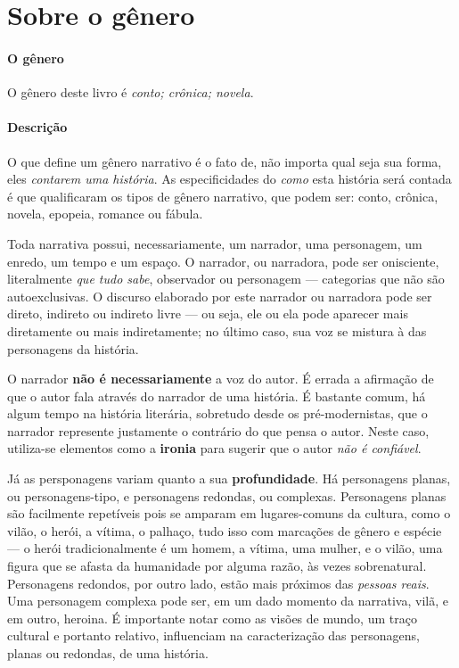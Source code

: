 \documentclass[11pt]{extarticle}
\begin{document}
\section{Sobre o gênero}

\paragraph{O gênero} O gênero deste livro é \textit{conto; crônica; novela}. 

\paragraph{Descrição} O que define um gênero narrativo é o fato de, não importa
qual seja sua forma, eles \textit{contarem uma história}.
As especificidades do \textit{como} esta história será contada é que
qualificaram os tipos de gênero narrativo, que podem ser: conto, crônica, novela,
epopeia, romance ou fábula. 

Toda narrativa possui, necessariamente, um narrador, uma personagem, um enredo,
um tempo e um espaço. O narrador, ou narradora, pode ser onisciente, literalmente
\textit{que tudo sabe}, observador ou personagem --- categorias que não são autoexclusivas.
O discurso elaborado por este narrador ou narradora pode ser direto, indireto ou indireto livre 
--- ou seja, ele ou ela pode aparecer mais diretamente ou mais indiretamente; no último caso,
sua voz se mistura à das personagens da história.

O narrador \textbf{não é necessariamente} a voz do autor. É errada a afirmação
de que o autor fala através do narrador de uma história. É bastante comum,
há algum tempo na história literária, sobretudo desde os pré-modernistas, que 
o narrador represente justamente o contrário do que pensa o autor. Neste caso, 
utiliza-se elementos como a \textbf{ironia} para sugerir que o autor \textit{não é confiável}.

Já as persponagens variam quanto a sua \textbf{profundidade}. Há personagens planas, ou
personagens-tipo, e personagens redondas, ou complexas. Personagens planas
são facilmente repetíveis pois se amparam em lugares-comuns da cultura, como
o vilão, o herói, a vítima, o palhaço, tudo isso com marcações de gênero e espécie ---
o herói tradicionalmente é um homem, a vítima, uma mulher, e o vilão, uma figura que 
se afasta da humanidade por alguma razão, às vezes sobrenatural. 
Personagens redondos, por outro lado, estão mais próximos das \textit{pessoas reais}.
Uma personagem complexa pode ser, em um dado momento da narrativa, vilã, e em 
outro, heroina. É importante notar como as visões de mundo, um traço cultural e 
portanto relativo, influenciam na caracterização das personagens, planas 
ou redondas, de uma história.
\end{document}
